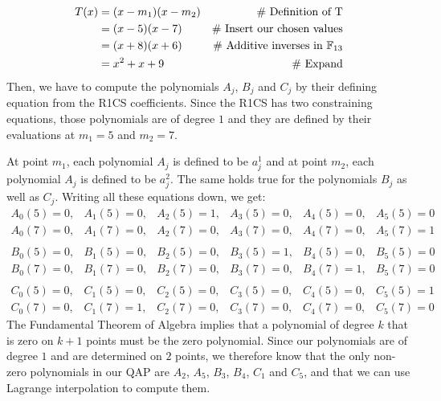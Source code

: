 \begin{example}[3-factorization]
\begin{align*}
T(x) & = (x-m_1)(x-m_2) & \text{\# Definition of T}\\
     & = (x-5)(x-7)  & \text{\# Insert our chosen values}\\
     & = (x+8)(x+6)  & \text{\# Additive inverses in } \mathbb{F}_{13}\\
     & = x^2 + x +9 & \text{\# Expand}
\end{align*}
Then, we have to compute the polynomials $A_j$, $B_j$ and $C_j$ by their defining equation from the R1CS coefficients. Since the R1CS has two constraining equations, those polynomials are of degree $1$ and they are defined by their evaluations at $m_1=5$ and $m_2=7$. 

At point $m_1$, each polynomial $A_j$ is defined to be $a_j^1$ and at point $m_2$, each polynomial $A_j$ is defined to be $a_j^2$. The same holds true for the polynomials $B_j$ as well as $C_j$. Writing all these equations down, we get:
$$
\begin{array}{llllll}
A_0(5)=0, & A_1(5)=0, & A_2(5)=1, & A_3(5)=0, & A_4(5)=0, & A_5(5)=0 \\
A_0(7)=0, & A_1(7)=0, & A_2(7)=0, & A_3(7)=0, & A_4(7)=0, & A_5(7)=1\\
\\
B_0(5)=0, & B_1(5)=0, & B_2(5)=0, & B_3(5)=1, & B_4(5)=0, & B_5(5)=0 \\
B_0(7)=0, & B_1(7)=0, & B_2(7)=0, & B_3(7)=0, & B_4(7)=1, & B_5(7)=0\\
\\
C_0(5)=0, & C_1(5)=0, & C_2(5)=0, & C_3(5)=0, & C_4(5)=0, & C_5(5)=1 \\
C_0(7)=0, & C_1(7)=1, & C_2(7)=0, & C_3(7)=0, & C_4(7)=0, & C_5(7)=0
\end{array}
$$
The Fundamental Theorem of Algebra implies that a polynomial of degree $k$ that is zero on $k+1$ points must be the zero polynomial. Since our polynomials are of degree $1$ and are determined on $2$ points, we therefore know that the only non-zero polynomials in our QAP are $A_2$, $A_5$, $B_3$, $B_4$, $C_1$ and $C_5$, and that we can use Lagrange interpolation to compute them. 


\end{example}
